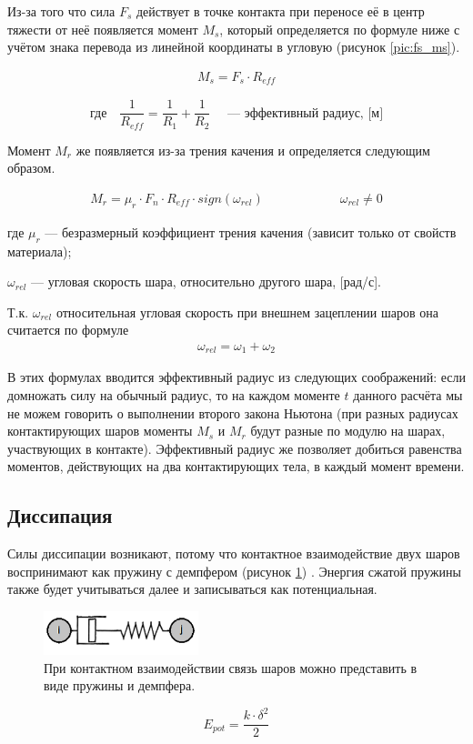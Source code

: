 \documentclass[utf8x, 14pt, oneside, a4paper]{article}
\begin{document}
Из-за того что сила $F_s$ действует в точке контакта при переносе её в центр тяжести от неё появляется момент $M_s$, который определяется по формуле ниже с учётом знака перевода из линейной координаты в угловую (рисунок \ref{pic:fs_ms}).

\begin{align}
\label{sliding_moment}
M_s = F_s \cdot R_{eff}
\end{align}

\[
\text{где} \quad \dfrac{1}{R_{eff}} = \dfrac{1}{R_1} + \dfrac{1}{R_2} \quad \text{ --- эффективный радиус, [м]}
\]

Момент $M_r$ же появляется из-за трения качения и определяется следующим образом.

\begin{align}
\label{rolling_moment}
M_r = \mu_r \cdot F_n \cdot R_{eff} \cdot sign(\omega_{rel}) \qquad \qquad \qquad \omega_{rel} \neq 0
\end{align}

где $\mu_r$ --- безразмерный коэффициент трения качения (зависит только от свойств материала);

$\omega_{rel}$ --- угловая скорость шара, относительно другого шара, [рад/с].

Т.к. $\omega_{rel}$ относительная угловая скорость при внешнем зацеплении шаров она считается по формуле 
\begin{align}
\label{omega_rel}
\omega_{rel} = \omega_1 + \omega_2
\end{align}

В этих формулах вводится эффективный радиус из следующих соображений: если домножать силу на обычный радиус, то на каждом моменте $t$ данного расчёта мы не можем говорить о выполнении второго закона Ньютона (при разных радиусах контактирующих шаров моменты $M_s$ и $M_r$ будут разные по модулю на шарах, участвующих в контакте).
Эффективный радиус же позволяет добиться равенства моментов, действующих на два контактирующих тела, в каждый момент времени.


\subsection{Диссипация}
\label{dempf_subsection}

Силы диссипации возникают, потому что контактное взаимодействие двух шаров воспринимают как пружину с демпфером (рисунок \ref{pic:dempf}) \cite{pruzhina}. 
Энергия сжатой пружины также будет учитываться далее и записываться как потенциальная.
\begin{figure}[H]
	\centering
	\includegraphics[width=0.4\textwidth]{dempf}
	\caption{При контактном взаимодействии связь шаров можно представить в виде пружины и демпфера.}
	\label{pic:dempf}
\end{figure} 
\begin{equation}
\label{eq:pot_energy}
E_{pot} = \dfrac{k \cdot \delta^2}{2}
\end{equation}
\end{document}
